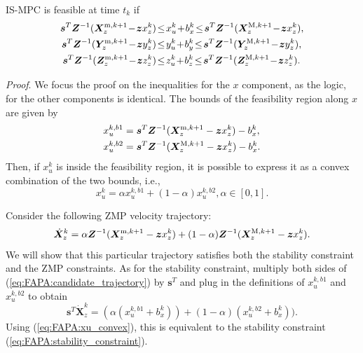 \begin{proposition}
\label{prop:feasibility}
IS-MPC is feasible at time $t_k$ if
\begin{align}
\label{eq:FAPA:mpc-feasibility-constraint}
\bm{s}^T \bm{Z}^{-1} (\bm{X}_z^{{\rm m}, k+1} \!-\! \bm{z} x_z^k)  \!&\le\! x_u^k \!+\! b_x^k \!\le\! \bm{s}^T \bm{Z}^{-1} (\bm{X}_z^{{\rm M}, k+1} \!-\! \bm{z} x_z^k),
\nonumber\\
\bm{s}^T \bm{Z}^{-1} (\bm{Y}_z^{{\rm m}, k+1} \!-\! \bm{z} y_z^k)  \!&\le\! y_u^k \!+\! b_y^k \!\le\! \bm{s}^T \bm{Z}^{-1} (\bm{Y}_z^{{\rm M}, k+1} \!-\! \bm{z} y_z^k),
\nonumber\\
\bm{s}^T \bm{Z}^{-1} (\bm{Z}_z^{{\rm m}, k+1} \!-\! \bm{z} z_z^k)  \!&\le\! z_u^k \!+\! b_z^k \!\le\! \bm{s}^T \bm{Z}^{-1} (\bm{Z}_z^{{\rm M}, k+1} \!-\! \bm{z} z_z^k).
\end{align}
\end{proposition}
{\em Proof}.
We focus the proof on the inequalities for the $x$ component, as the logic, for the other components is identical. The bounds of the feasibility region along $x$ are given by
\begin{align*}
x_u^{k,b1} &= \bm{s}^T \bm{Z}^{-1} (\bm{X}_z^{{\rm m}, k+1} - \bm{z} x_z^k) - b_x^k, \\
x_u^{k,b2} &= \bm{s}^T \bm{Z}^{-1} (\bm{X}_z^{{\rm M}, k+1} - \bm{z} x_z^k) - b_x^k.
\end{align*}
Then, if $x_u^k$ is inside the feasibility region, it is possible to express it as a convex combination of the two bounds, i.e.,
\begin{equation}\label{eq:FAPA:xu_convex}
x_u^k = \alpha x_u^{k,b1} + (1-\alpha)x_u^{k,b2}, \alpha \in [0, 1].
\end{equation}

Consider the following ZMP velocity trajectory:
\begin{equation}\label{eq:FAPA:candidate_trajectory}
\dot{\bm{X}}_z^k = \alpha \bm{Z}^{-1}(\bm{X}_z^{{\rm m}, k+1} - \bm{z} x_z^k) + (1-\alpha)\bm{Z}^{-1}(\bm{X}_z^{{\rm M}, k+1} - \bm{z} x_z^k).
\end{equation}
We will show that this particular trajectory satisfies both the stability constraint and the ZMP constraints. As for the stability constraint, multiply both sides of (\ref{eq:FAPA:candidate_trajectory}) by $\bm{s}^T$
and plug in the definitions of $x_u^{k,b1}$ and $x_u^{k,b2}$ to obtain
\begin{equation*}
\bm{s}^T\dot{\bm X}_z^k = (\alpha (x_u^{k,b1} + b^k_x)) + (1-\alpha)(x_u^{k,b2} + b^k_x)).
\end{equation*}
Using (\ref{eq:FAPA:xu_convex}), this is equivalent to the stability constraint (\ref{eq:FAPA:stability_constraint}).

